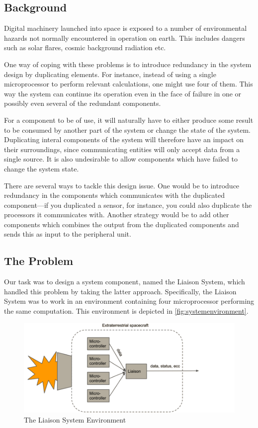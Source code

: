 \subsection{Background}
Digital machinery launched into space is exposed to a number of
environmental hazards not normally encountered in operation on
earth. This includes dangers such as solar flares, cosmic background
radiation etc.\cite{nasa}

One way of coping with these problems is to introduce redundancy in
the system design by duplicating elements. For instance, instead of
using a single microprocessor to perform relevant calculations, one
might use four of them. This way the system can continue its operation
even in the face of failure in one or possibly even several of the
redundant components.

For a component to be of use, it will naturally have to either produce
some result to be consumed by another part of the system or change the
state of the system. Duplicating interal components of the system will
therefore have an impact on their surroundings, since communicating
entities will only accept data from a single source. It is also
undesirable to allow components which have failed to change the system
state.

There are several ways to tackle this design issue. One would be to
introduce redundancy in the components which communicates with the
duplicated component---if you duplicated a sensor, for instance, you
could also duplicate the processors it communicates with. Another
strategy would be to add other components which combines the output
from the duplicated components and sends this as input to the
peripheral unit.

\subsection{The Problem}

Our task was to design a system component, named the Liaison System,
which handled this problem by taking the latter
approach. Specifically, the Liaison System was to work in an
environment containing four microprocessor performing the same
computation. This environment is depicted in
\autoref{fig:systemenvironment}. 

\begin{figure}[H]
    \includegraphics[width=15cm]{fig_system_env}
    \caption{The Liaison System Environment}
    \label{fig:systemenvironment}
\end{figure}

